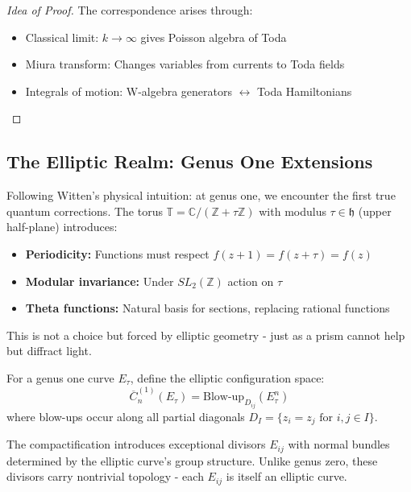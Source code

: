 \begin{proof}[Idea of Proof]
The correspondence arises through:
\begin{itemize}
\item Classical limit: $k \to \infty$ gives Poisson algebra of Toda
\item Miura transform: Changes variables from currents to Toda fields
\item Integrals of motion: W-algebra generators $\leftrightarrow$ Toda Hamiltonians
\end{itemize}
\end{proof}


\subsection{The Elliptic Realm: Genus One Extensions}\label{subsec:elliptic}

\begin{remark}
Following Witten's physical intuition: at genus one, we encounter the first true quantum corrections. The torus $\mathbb{T} = \mathbb{C}/(\mathbb{Z} + \tau\mathbb{Z})$ with modulus $\tau \in \mathfrak{h}$ (upper half-plane) introduces:
\begin{itemize}
\item \textbf{Periodicity:} Functions must respect $f(z + 1) = f(z + \tau) = f(z)$
\item \textbf{Modular invariance:} Under $SL_2(\mathbb{Z})$ action on $\tau$
\item \textbf{Theta functions:} Natural basis for sections, replacing rational functions
\end{itemize}
This is not a choice but forced by elliptic geometry - just as a prism cannot help but diffract light.
\end{remark}

\begin{definition}\label{def:elliptic-config}
For a genus one curve $E_\tau$, define the elliptic configuration space:
$$\overline{C}_n^{(1)}(E_\tau) = \text{Blow-up}_{D_{ij}}(E_\tau^n)$$
where blow-ups occur along all partial diagonals $D_I = \{z_i = z_j \text{ for } i,j \in I\}$.

The compactification introduces exceptional divisors $E_{ij}$ with normal bundles determined by the elliptic curve's group structure. Unlike genus zero, these divisors carry nontrivial topology - each $E_{ij}$ is itself an elliptic curve.
\end{definition}

